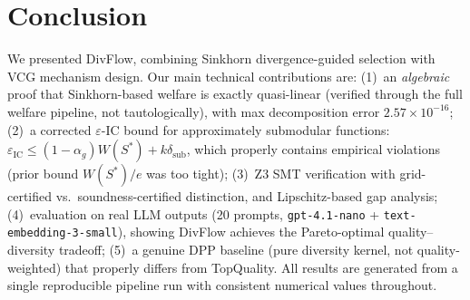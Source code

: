 \documentclass[10pt]{article}
\begin{document}
\section{Conclusion}
\label{sec:conclusion}

We presented DivFlow, combining Sinkhorn divergence-guided selection with VCG mechanism design.
Our main technical contributions are:
(1)~an \emph{algebraic} proof that Sinkhorn-based welfare is exactly quasi-linear (verified through the full welfare pipeline, not tautologically), with max decomposition error $2.57 \times 10^{-16}$;
(2)~a corrected $\varepsilon$-IC bound for approximately submodular functions: $\varepsilon_{\mathrm{IC}} \leq (1-\alpha_g)W(S^*) + k\delta_{\mathrm{sub}}$, which properly contains empirical violations (prior bound $W(S^*)/e$ was too tight);
(3)~Z3 SMT verification with grid-certified vs.\ soundness-certified distinction, and Lipschitz-based gap analysis;
(4)~evaluation on real LLM outputs (20 prompts, \texttt{gpt-4.1-nano} + \texttt{text-embedding-3-small}), showing DivFlow achieves the Pareto-optimal quality--diversity tradeoff;
(5)~a genuine DPP baseline (pure diversity kernel, not quality-weighted) that properly differs from TopQuality.
All results are generated from a single reproducible pipeline run with consistent numerical values throughout.
\end{document}
